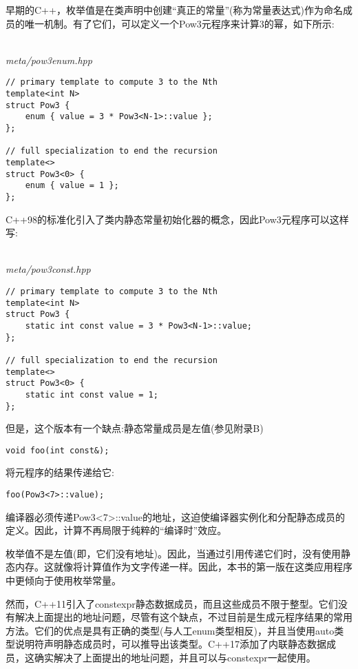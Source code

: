 
早期的C++，枚举值是在类声明中创建“真正的常量”(称为常量表达式)作为命名成员的唯一机制。有了它们，可以定义一个Pow3元程序来计算3的幂，如下所示:

\hspace*{\fill} \\ %
\noindent
\textit{meta/pow3enum.hpp}
\begin{lstlisting}[style=styleCXX]
// primary template to compute 3 to the Nth
template<int N>
struct Pow3 {
	enum { value = 3 * Pow3<N-1>::value };
};

// full specialization to end the recursion
template<>
struct Pow3<0> {
	enum { value = 1 };
};
\end{lstlisting}

C++98的标准化引入了类内静态常量初始化器的概念，因此Pow3元程序可以这样写:

\hspace*{\fill} \\ %
\noindent
\textit{meta/pow3const.hpp}
\begin{lstlisting}[style=styleCXX]
// primary template to compute 3 to the Nth
template<int N>
struct Pow3 {
	static int const value = 3 * Pow3<N-1>::value;
};

// full specialization to end the recursion
template<>
struct Pow3<0> {
	static int const value = 1;
};
\end{lstlisting}

但是，这个版本有一个缺点:静态常量成员是左值(参见附录B)

\begin{lstlisting}[style=styleCXX]
void foo(int const&);
\end{lstlisting}

将元程序的结果传递给它:

\begin{lstlisting}[style=styleCXX]
foo(Pow3<7>::value);
\end{lstlisting}

编译器必须传递Pow3<7>::value的地址，这迫使编译器实例化和分配静态成员的定义。因此，计算不再局限于纯粹的“编译时”效应。

枚举值不是左值(即，它们没有地址)。因此，当通过引用传递它们时，没有使用静态内存。这就像将计算值作为文字传递一样。因此，本书的第一版在这类应用程序中更倾向于使用枚举常量。

然而，C++11引入了constexpr静态数据成员，而且这些成员不限于整型。它们没有解决上面提出的地址问题，尽管有这个缺点，不过目前是生成元程序结果的常用方法。它们的优点是具有正确的类型(与人工enum类型相反)，并且当使用auto类型说明符声明静态成员时，可以推导出该类型。C++17添加了内联静态数据成员，这确实解决了上面提出的地址问题，并且可以与constexpr一起使用。























